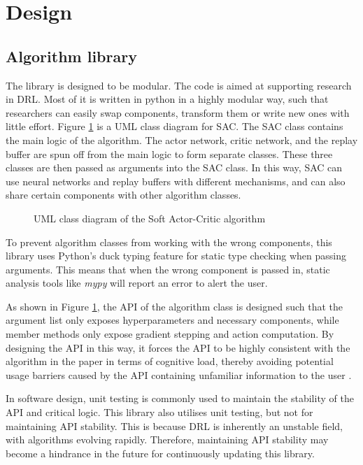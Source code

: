 \newpage
\section{Design} \label{sec:design}

\subsection{Algorithm library}

The library is designed to be modular. The code is aimed at supporting research in DRL. Most of it is written in python in a highly modular way, such that researchers can easily swap components, transform them or write new ones with little effort. Figure \ref{fig:sac-uml} is a UML class diagram for SAC. The SAC class contains the main logic of the algorithm. The actor network, critic network, and the replay buffer are spun off from the main logic to form separate classes. These three classes are then passed as arguments into the SAC class. In this way, SAC can use neural networks and replay buffers with different mechanisms, and can also share certain components with other algorithm classes.

\begin{figure}[htbp]
   \centering
   
   \caption{UML class diagram of the Soft Actor-Critic algorithm}
   \label{fig:sac-uml}
\end{figure}

To prevent algorithm classes from working with the wrong components, this library uses Python's duck typing feature for static type checking when passing arguments. This means that when the wrong component is passed in, static analysis tools like \textit{mypy} will report an error to alert the user.

As shown in Figure \ref{fig:sac-uml}, the API of the algorithm class is designed such that the argument list only exposes hyperparameters and necessary components, while member methods only expose gradient stepping and action computation. By designing the API in this way, it forces the API to be highly consistent with the algorithm in the paper in terms of cognitive load, thereby avoiding potential usage barriers caused by the API containing unfamiliar information to the user \cite{ref:api}.

In software design, unit testing is commonly used to maintain the stability of the API and critical logic. This library also utilises unit testing, but not for maintaining API stability. This is because DRL is inherently an unstable field, with algorithms evolving rapidly. Therefore, maintaining API stability may become a hindrance in the future for continuously updating this library.


